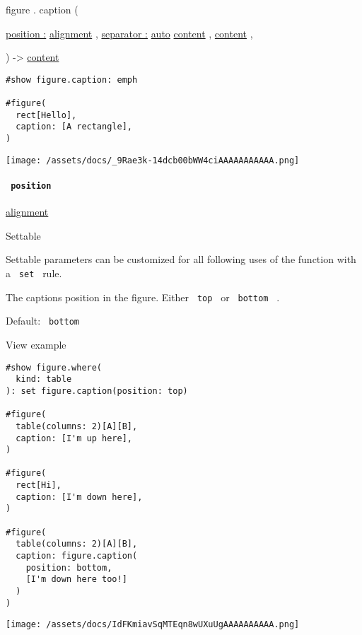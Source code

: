 figure { . } { caption } (

{ \hyperref[definitions-caption-parameters-position]{position :}
\href{/docs/reference/layout/alignment/}{alignment} , } {
\hyperref[definitions-caption-parameters-separator]{separator :}
\href{/docs/reference/foundations/auto/}{auto}
\href{/docs/reference/foundations/content/}{content} , } {
\href{/docs/reference/foundations/content/}{content} , }

) -\textgreater{} \href{/docs/reference/foundations/content/}{content}

\begin{verbatim}
#show figure.caption: emph

#figure(
  rect[Hello],
  caption: [A rectangle],
)
\end{verbatim}

\texttt{[image: /assets/docs/\_9Rae3k-14dcb00bWW4ciAAAAAAAAAAA.png]}

\paragraph{\texorpdfstring{\texttt{\ position\ }}{ position }}\label{definitions-caption-position}

\href{/docs/reference/layout/alignment/}{alignment}

{{ Settable }}

\label{definitions-caption-position-settable-tooltip}
Settable parameters can be customized for all following uses of the
function with a \texttt{\ set\ } rule.

The caption\textquotesingle s position in the figure. Either
\texttt{\ top\ } or \texttt{\ bottom\ } .

Default: \texttt{\ bottom\ }


View example

\begin{verbatim}
#show figure.where(
  kind: table
): set figure.caption(position: top)

#figure(
  table(columns: 2)[A][B],
  caption: [I'm up here],
)

#figure(
  rect[Hi],
  caption: [I'm down here],
)

#figure(
  table(columns: 2)[A][B],
  caption: figure.caption(
    position: bottom,
    [I'm down here too!]
  )
)
\end{verbatim}

\texttt{[image: /assets/docs/IdFKmiavSqMTEqn8wUXuUgAAAAAAAAAA.png]}

